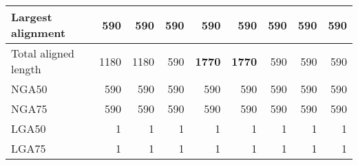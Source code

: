 \documentclass[12pt,a4paper]{article}
\begin{document}
\begin{table}[ht]
\begin{center}
\begin{tabular}{|l*{8}{|r}|}
Largest alignment & 590 & 590 & 590 & 590 & 590 & 590 & 590 & 590 \\ \hline
Total aligned length & 1180 & 1180 & 590 & {\bf 1770} & {\bf 1770} & 590 & 590 & 590 \\ \hline
NGA50 & 590 & 590 & 590 & 590 & 590 & 590 & 590 & 590 \\ \hline
NGA75 & 590 & 590 & 590 & 590 & 590 & 590 & 590 & 590 \\ \hline
LGA50 & 1 & 1 & 1 & 1 & 1 & 1 & 1 & 1 \\ \hline
LGA75 & 1 & 1 & 1 & 1 & 1 & 1 & 1 & 1 \\ \hline
\end{tabular}
\end{center}
\end{table}
\end{document}
